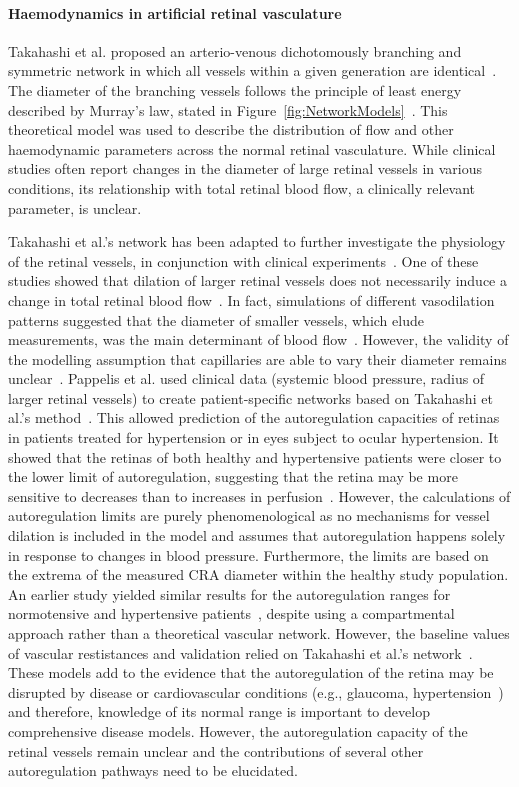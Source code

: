 \documentclass{article}
\begin{document}
\paragraph*{Haemodynamics in artificial retinal vasculature}

Takahashi et al. proposed an arterio-venous dichotomously branching and symmetric network in which all vessels within a given generation are identical~\cite{Takahashi_2009}.
The diameter of the branching vessels follows the principle of least energy described by Murray's law, stated in Figure~\ref{fig:NetworkModels}~\cite{Murray_1926}.
This theoretical model was used to describe the distribution of flow and other haemodynamic parameters across the normal retinal vasculature.
While clinical studies often report changes in the diameter of large retinal vessels in various conditions, its relationship with total retinal blood flow, a clinically relevant parameter, is unclear.

Takahashi et al.'s network has been adapted to further investigate the physiology of the retinal vessels, in conjunction with clinical experiments~\cite{Aschinger_2017,Pappelis_2020}.
One of these studies showed that dilation of larger retinal vessels does not necessarily induce a change in total retinal blood flow~\cite{Aschinger_2017}.
In fact, simulations of different vasodilation patterns suggested that the diameter of smaller vessels, which elude measurements, was the main determinant of blood flow~\cite{Aschinger_2017}.
However, the validity of the modelling assumption that capillaries are able to vary their diameter remains unclear~\cite{Kur_2012}.
Pappelis et al. used clinical data (systemic blood pressure, radius of larger retinal vessels) to create patient-specific networks based on Takahashi et al.'s method~\cite{Pappelis_2020}.
This allowed prediction of the autoregulation capacities of retinas in patients treated for hypertension or in eyes subject to ocular hypertension.
It showed that the retinas of both healthy and hypertensive patients were closer to the lower limit of autoregulation, suggesting that the retina may be more sensitive to decreases than to increases in perfusion~\cite{Pappelis_2020}.
However, the calculations of autoregulation limits are purely phenomenological as no mechanisms for vessel dilation is included in the model and assumes that autoregulation happens solely in response to changes in blood pressure.
Furthermore, the limits are based on the extrema of the measured CRA diameter within the healthy study population.
An earlier study yielded similar results for the autoregulation ranges for normotensive and hypertensive patients~\cite{Guidoboni_2014a}, despite using a compartmental approach rather than a theoretical vascular network.
However, the baseline values of vascular restistances and validation relied on Takahashi et al.'s network~\cite{Takahashi_2009}.
These models add to the evidence that the autoregulation of the retina may be disrupted by disease or cardiovascular conditions (e.g., glaucoma, hypertension~\cite{Pappelis_2020}) and therefore, knowledge of its normal range is important to develop comprehensive disease models.
However, the autoregulation capacity of the retinal vessels remain unclear and the contributions of several other autoregulation pathways need to be elucidated.
\end{document}
